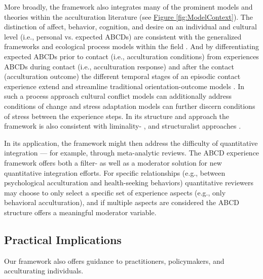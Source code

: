 \documentclass[man, 12pt, a4paper, mask]{apa7}
\newcommand{\fgrref}[2][]{\hyperref[#2]{Figure \ref*{#2}#1}}
\begin{document}
More broadly, the framework also integrates many of the prominent models and theories within the acculturation literature (see \fgrref{fig:ModelContext}). The distinction of affect, behavior, cognition, and desire on an individual and cultural level (i.e., personal vs. expected ABCDs) are consistent with the generalized frameworks \citep[e.g.,][]{Berry2005, Cross1991} and ecological process models within the field \citep[e.g.,][]{Ward2016, Serdarevic2005, Mistry2010}. And by differentiating expected ABCDs prior to contact (i.e., acculturation conditions) from experiences ABCDs during contact (i.e., acculturation response) and after the contact (acculturation outcome) the different temporal stages of an episodic contact experience extend and streamline traditional orientation-outcome models \citep[e.g.,][]{Arends-Toth2006a, TeLindert2008a}. In such a process approach cultural conflict models can additionally address conditions of change \citep[e.g.,][]{Robinson2019} and stress adaptation models can further discern conditions of stress \citep[e.g.,][]{Kim1988, Hajro2019, Sam2006b} between the experience steps. In its structure and approach the framework is also consistent with liminality- \citep[e.g.,][]{Loon2021, Baird2015}, and structuralist approaches \citep[e.g.,][]{Kemppainen2020}.

In its application, the framework might then address the difficulty of quantitative integration --- for example, through meta-analytic reviews. The ABCD experience framework offers both a filter- as well as a moderator solution for new quantitative integration efforts. For specific relationships (e.g., between psychological acculturation and health-seeking behaviors) quantitative reviewers may choose to only select a specific set of experience aspects (e.g., only behavioral acculturation), and if multiple aspects are considered the ABCD structure offers a meaningful moderator variable. 

\subsection{Practical Implications}
Our framework also offers guidance to practitioners, policymakers, and acculturating individuals. 

\end{document}
